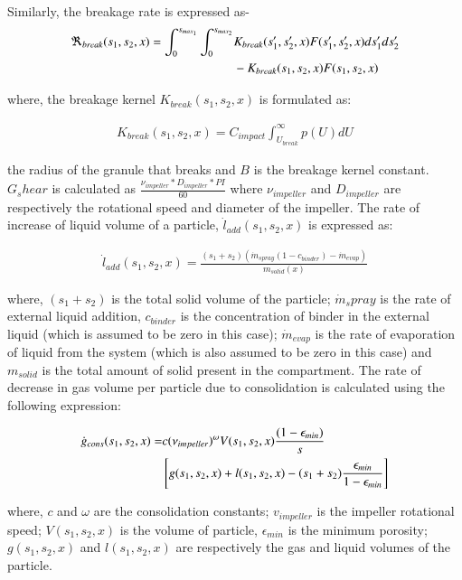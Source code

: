\documentclass[preprint,10pt,authoryear,review]{elsarticle}
\begin{document}
\begin{linenumbers}
Similarly, the breakage rate is expressed as-
\begin{align}
\Re_{break}(s_1,s_2,x)  = \int_0^{s_{max_1}} \int_0^{s_{max_2}} & \notag
K_{break}(s_1',s_2',x)F(s_1',s_2',x)ds_1'ds_2' \\ &  - K_{break}(s_1,s_2,x)F(s_1,s_2,x) 
\end{align}
	    
where, the breakage kernel $K_{break}(s_1,s_2,x)$ is formulated as: 

\begin{align}
K_{break}(s_1,s_2,x) = C_{impact}\int_{U_{break}}^{\infty}p(U)dU	    
\end{align}


the radius of the granule that breaks and $B$ is the breakage kernel constant. $G_shear$ is 
calculated as $\frac{\nu_{impeller}*D_{impeller}*PI}{60}$ where $\nu_{impeller}$ and $D_{impeller}$ 
are respectively the rotational speed and diameter of the impeller.
The rate of increase of liquid volume of a particle, $\dot{l}_{add}(s_1,s_2,x)$ is expressed as:

\begin{align}
\dot{l}_{add}(s_1,s_2,x) = \frac{(s_1+s_2)(\dot{m}_{spray}(1-c_{binder})-\dot{m}_{evap})}{m_{solid}(x)}
\label{eqn:mthds_liq_addn_rate}
\end{align}

where, $(s_1+s_2)$  is the total solid volume of the particle; $\dot{m}_spray$ is the rate of external 
liquid addition, $c_{binder}$ is the concentration of binder in the external liquid (which is assumed to 
be zero in this case); $\dot{m}_{evap}$ is the rate of evaporation of liquid from 
the system (which is also assumed to be zero in this case) and $m_{solid}$ is the total amount of solid 
present in the compartment.
The rate of decrease in gas volume per particle due to consolidation is calculated using the 
following expression: \citep{Verkoeijen2002} 

\begin{align}
\dot{g}_{cons}(s_1,s_2,x)=&c (\nu_{impeller})^{\omega}V(s_1,s_2,x)\frac{(1-\epsilon_{min})}{s} 
\notag \\ 
& \left[g(s_1,s_2,x)+l(s_1,s_2,x) -(s_1+s_2)\frac{\epsilon_{min}}{1-\epsilon_{min}}\right]
\label{eqn:mthds_rate_gas_vol_part}
\end{align}        

 where, $c$ and $\omega$ are the consolidation constants; $v_{impeller}$ is the impeller 
rotational speed; $V(s_1,s_2,x)$ is the volume of particle, $\epsilon_{min}$ is the minimum porosity; 
$g(s_1,s_2,x)$ and $l(s_1,s_2,x)$ are respectively the gas and liquid volumes of the particle.


\end{linenumbers}
\end{document}
